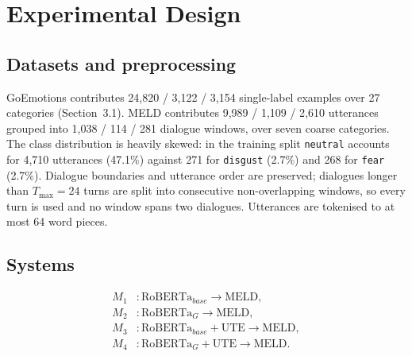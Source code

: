\documentclass[sigconf,nonacm]{acmart}
\begin{document}
\section{Experimental Design}

\subsection{Datasets and preprocessing}
GoEmotions contributes 24{,}820 / 3{,}122 / 3{,}154 single-label examples over 27
categories (Section~3.1). MELD contributes 9{,}989 / 1{,}109 / 2{,}610 utterances grouped
into 1{,}038 / 114 / 281 dialogue windows, over seven coarse categories. The class
distribution is heavily skewed: in the training split \texttt{neutral} accounts for 4{,}710
utterances (47.1\%) against 271 for \texttt{disgust} (2.7\%) and 268 for \texttt{fear}
(2.7\%). Dialogue boundaries and utterance order are preserved; dialogues longer than
$T_{\max} = 24$ turns are split into consecutive non-overlapping windows, so every turn is
used and no window spans two dialogues. Utterances are tokenised to at most 64 word pieces.

\subsection{Systems}
\begin{align*}
M_1 &: \mathrm{RoBERTa}_{base} \rightarrow \mathrm{MELD},\\
M_2 &: \mathrm{RoBERTa}_G \rightarrow \mathrm{MELD},\\
M_3 &: \mathrm{RoBERTa}_{base} + \mathrm{UTE} \rightarrow \mathrm{MELD},\\
M_4 &: \mathrm{RoBERTa}_G + \mathrm{UTE} \rightarrow \mathrm{MELD}.
\end{align*}


\end{document}
